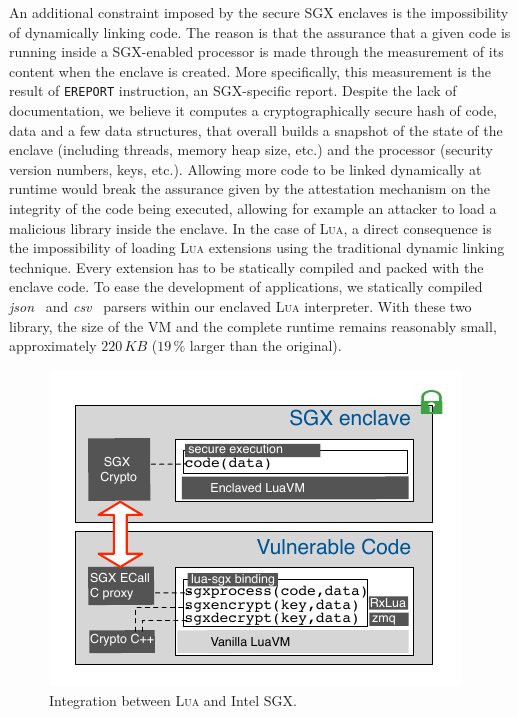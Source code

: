 An additional constraint imposed by the secure SGX enclaves is the impossibility of dynamically linking code. 
The reason is that the assurance that a given code is running inside a SGX-enabled processor is made through the measurement of its content when the enclave is created.
More specifically, this measurement is the result of \texttt{EREPORT} instruction, an SGX-specific report.
Despite the lack of documentation, we believe it computes a cryptographically secure hash of code, data and a few data structures, that overall builds a snapshot of the state of the enclave (including threads, memory heap size, etc.) and the processor (security version numbers, keys, etc.).
Allowing more code to be linked dynamically at runtime would break the assurance given by the attestation mechanism on the integrity of the code being executed, allowing for example an attacker to load a malicious library inside the enclave.
In the case of \textsc{Lua}, a direct consequence is the impossibility of loading \textsc{Lua} extensions using the traditional dynamic linking technique. 
Every extension has to be statically compiled and packed with the enclave code. 
To ease the development of \SYS applications, we statically compiled \emph{json}~\cite{rfc7159} and \emph{csv}~\cite{rfc4180} parsers within our enclaved \textsc{Lua} interpreter.
With these two library, the size of the VM and the complete runtime remains reasonably small, approximately $220\,KB$ ($19\,\%$ larger than the original).

\begin{figure}[t!]
  \centering
  \includegraphics[width=.9\linewidth]{images/arch-sgxlua}
  \caption{Integration between \textsc{Lua} and Intel SGX.}
  \label{fig:arch-luasgx}
\end{figure}


